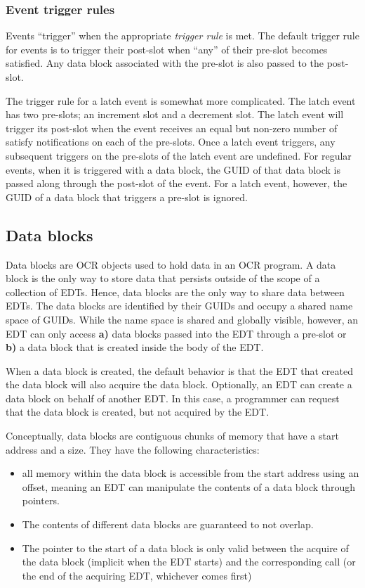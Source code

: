 \subsubsection{Event trigger rules}
Events ``trigger'' when the appropriate \emph{trigger
rule} is met. The default trigger rule for events
is to trigger their post-slot when ``any'' of their pre-slot becomes
satisfied. Any data block associated with the pre-slot is also passed
to the post-slot.

The trigger rule for a latch event is somewhat more complicated. The
latch event has two pre-slots; an increment slot and a decrement
slot. The latch event will trigger its post-slot when the event
receives an equal but non-zero number of satisfy notifications on each
of the pre-slots. Once a latch event triggers, any subsequent
triggers on the pre-slots of the latch event are undefined. For
regular events, when it is triggered with a data block, the GUID of
that data block is passed along through the post-slot of the
event. For a latch event, however, the GUID of a data block that
triggers a pre-slot is ignored.

\subsection{Data blocks}
\label{sec:data blocks}
Data blocks are OCR objects used to hold data in an OCR program. A
data block is the only way to store data that persists outside of the
scope of a collection of EDTs. Hence, data blocks are the only way to
share data between EDTs. The data blocks are identified by their
GUIDs and occupy a shared name space of GUIDs. While the name space
is shared and globally visible, however, an EDT can only access {\bf a)}
data blocks passed into the EDT through a pre-slot or {\bf b)} a data block
that is created inside the body of the EDT.

When a data block is created, the default behavior is that the EDT
that created the data block will also acquire the data block.
Optionally, an EDT can
create a data block on behalf of another EDT. In this case, a
programmer can request that the data block is created, but not
acquired by the EDT.

Conceptually, data blocks are contiguous chunks of memory
that have a start address and a size. They have the following characteristics:
\begin{itemize}
\item all memory within the data block is accessible from the
start address using an offset, meaning an EDT can manipulate the
contents of a data block through pointers.
\item The contents of different data blocks are guaranteed to not
overlap.
\item The pointer to the start of a data block is only valid between
the acquire of the data block (implicit when the EDT starts) and the
corresponding  call (or the end of the acquiring
EDT, whichever comes first)
\end{itemize}

